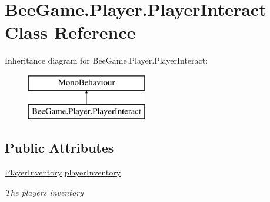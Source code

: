 \hypertarget{class_bee_game_1_1_player_1_1_player_interact}{}\section{Bee\+Game.\+Player.\+Player\+Interact Class Reference}
\label{class_bee_game_1_1_player_1_1_player_interact}
Inheritance diagram for Bee\+Game.\+Player.\+Player\+Interact\+:\begin{figure}[H]
\begin{center}
\leavevmode
\includegraphics[height=2.000000cm]{class_bee_game_1_1_player_1_1_player_interact}
\end{center}
\end{figure}
\subsection*{Public Attributes}
\begin{DoxyCompactItemize}
\item 
\hyperlink{class_bee_game_1_1_inventory_1_1_player_inventory}{Player\+Inventory} \hyperlink{class_bee_game_1_1_player_1_1_player_interact_af158edc4bacd34c13fffaa1fe4839de2}{player\+Inventory}
\begin{DoxyCompactList}\small\item\em The players inventory \end{DoxyCompactList}\end{DoxyCompactItemize}
